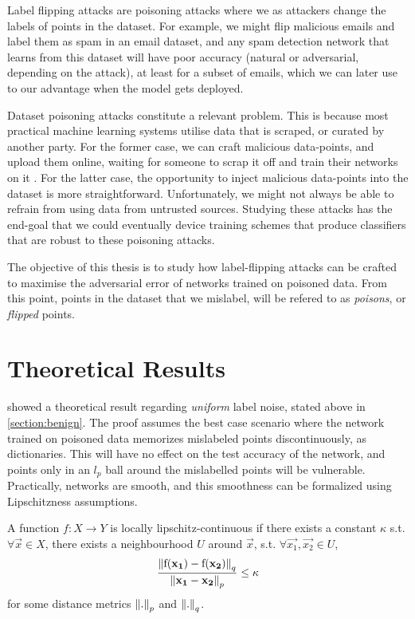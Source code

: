 \documentclass[12pt, oneside]{book}
\begin{document}
Label flipping attacks \citep{label-flip-SVMs,certified-robustness} are
poisoning attacks where we as attackers change the labels of points in the
dataset. For example, we might flip malicious emails and label them as spam in
an email dataset, and any spam detection network that learns from this dataset
will have poor accuracy (natural or adversarial, depending on the attack), at
least for a subset of emails, which we can later use to our advantage when the
model gets deployed.

Dataset poisoning attacks constitute a relevant problem. This is because most
practical machine learning systems utilise data that is scraped, or curated by
another party. For the former case, we can craft malicious data-points, and
upload them online, waiting for someone to scrap it off and train their networks
on it \citep{transferable-clean-label-poisoning}. For the latter case, the
opportunity to inject malicious data-points into the dataset is more
straightforward. Unfortunately, we might not always be able to refrain from
using data from untrusted sources. Studying these attacks has the end-goal that
we could eventually device training schemes that produce classifiers that are
robust to these poisoning attacks.

The objective of this thesis is to study how label-flipping attacks can be
crafted to maximise the adversarial error of networks trained on poisoned data.
From this point, points in the dataset that we mislabel, will be refered to as
\emph{poisons}, or \emph{flipped} points.


\chapter{Theoretical Results}
\label{section:lipschitzness-assumption}

\citet{sanyal2021how} showed a theoretical result regarding \emph{uniform} label
noise, stated above in \ref{section:benign}. The proof assumes the best case
scenario where the network trained on poisoned data memorizes mislabeled points
discontinuously, as dictionaries. This will have no effect on the test accuracy
of the network, and points only in an $l_p$ ball around the mislabelled points
will be vulnerable. Practically, networks are smooth, and this smoothness can be
formalized using Lipschitzness assumptions.

A function $f: X \to Y$ is locally lipschitz-continuous if there exists a
constant $\kappa$ s.t. $\forall \vec{x} \in X$, there exists a neighbourhood $U$
around $\vec{x}$, s.t. $\forall \vec{x_1}, \vec{x_2} \in U$,
\begin{equation*}
    \label{eq:lipschitz}
    \frac{\mathrm{\left\lVert f({\mathbf{x_1}}) - f({\mathbf{x_2}})\right\rVert}_q}
        {\mathrm{\left\lVert{\mathbf{x_1}} - {\mathbf{x_2}}\right\rVert}_p}
    \leq \kappa
\end{equation*}
for some distance metrics $\mathrm{\left\lVert.\right\rVert}_p$ and $\mathrm{\left\lVert.\right\rVert}_q$.
\end{document}
